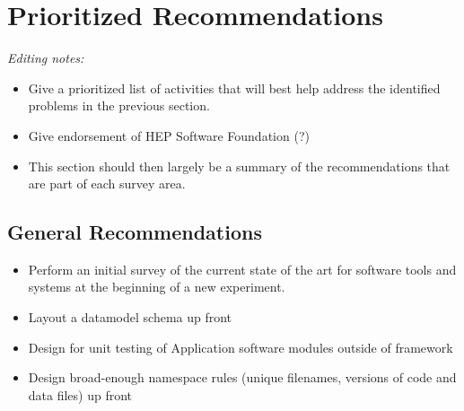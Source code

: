 \section{Prioritized Recommendations}


\textit{Editing notes:}
\begin{itemize}
\item Give a prioritized list of activities that will best help address the identified problems in the previous section. 
\item Give endorsement of HEP Software Foundation (?)
\item This section should then largely be a summary of the recommendations that are part of each survey area.
\end{itemize}
\subsection{General Recommendations}
\begin{itemize}
\item Perform an initial survey of the current state of the art for software tools and systems at the beginning of a new experiment.
\item Layout a datamodel schema up front
\item Design for unit testing of Application software modules outside of framework
\item Design broad-enough namespace rules (unique filenames, versions of code and data files) up front
\end{itemize}

